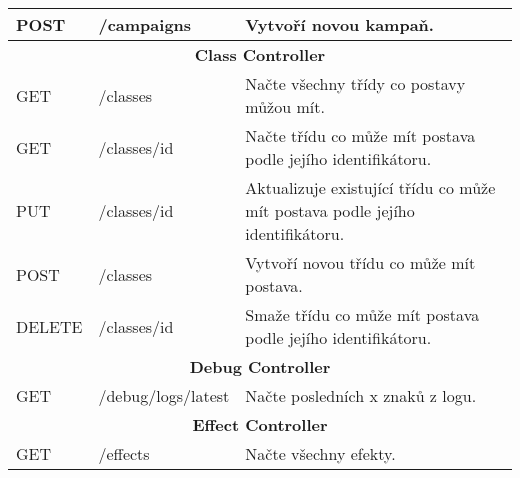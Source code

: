 \begin{longtable}{|l|l|p{}|}
    POST            & /campaigns                             & Vytvoří novou kampaň.                                                                                                                      \\
    \hline
    \multicolumn{3}{|c|}{\textbf{Class Controller}}                                                                                                                                                       \\
    \hline
    GET             & /classes                               & Načte všechny třídy co postavy můžou mít.                                                                                                  \\
    GET             & /classes/{id}                          & Načte třídu co může mít postava podle jejího identifikátoru.                                                                               \\
    PUT             & /classes/{id}                          & Aktualizuje existující třídu co může mít postava podle jejího identifikátoru.                                                              \\
    POST            & /classes                               & Vytvoří novou třídu co může mít postava.                                                                                                   \\
    DELETE          & /classes/{id}                          & Smaže třídu co může mít postava podle jejího identifikátoru.                                                                               \\
    \hline
    \multicolumn{3}{|c|}{\textbf{Debug Controller}}                                                                                                                                                       \\
    \hline
    GET             & /debug/logs/latest                     & Načte posledních x znaků z logu.                                                                                                           \\
    \hline
    \multicolumn{3}{|c|}{\textbf{Effect Controller}}                                                                                                                                                      \\
    \hline
    GET             & /effects                               & Načte všechny efekty.                                                                                                                      \\

\end{longtable}
